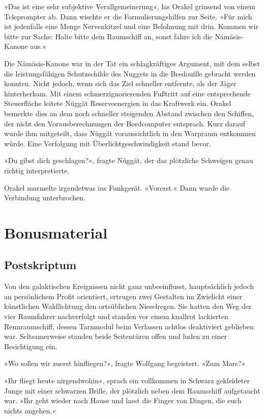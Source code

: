 »Das ist eine sehr subjektive Verallgemeinerung«, las Orakel grinsend von einem Teleprompter ab. Dann wischte er die Formulierungshilfen zur Seite. »Für mich ist jedenfalls eine Menge Nervenkitzel und eine Belohnung mit drin. Kommen wir bitte zur Sache: Halte bitte dein Raumschiff an, sonst fahre ich die Nämäsis-Kanone aus.«

Die Nämäsis-Kanone war in der Tat ein schlagkräftiges Argument, mit dem selbst die leistungsfähigen Schutzschilde des Nuggets in die Bredouille gebracht werden konnten. Nicht jedoch, wenn sich das Ziel schneller entfernte, als der Jäger hinterherkam. Mit einem schmerzignorierenden Fußtritt auf eine entsprechende Steuerfläche leitete Nüggät Reserveenergien in das Kraftwerk ein. Orakel bemerkte dies an dem noch schneller steigenden Abstand zwischen den Schiffen, der nicht den Vorausberechnungen der Bordcomputer entsprach. Kurz darauf wurde ihm mitgeteilt, dass Nüggät voraussichtlich in den Warpraum entkommen würde. Eine Verfolgung mit Überlichtgeschwindigkeit stand bevor.

»Du gibst dich geschlagen?«, fragte Nüggät, der das plötzliche Schweigen genau richtig interpretierte.

Orakel murmelte irgendetwas ins Funkgerät. »Vorerst.« Dann wurde die Verbindung unterbrochen.



\part{Bonusmaterial}

\chapter{Postskriptum}

Von den galaktischen Ereignissen nicht ganz unbeeinflusst, hauptsächlich jedoch an persönlichem Profit orientiert, ertrugen zwei Gestalten im Zwielicht einer künstlichen Waldlichtung den ortsüblichen Nieselregen. Sie hatten den Weg der vier Raumfahrer nachverfolgt und standen vor einem knallrot lackierten Rennraumschiff, dessen Tarnmodul beim Verlassen achtlos deaktiviert geblieben war. Seltsamerweise standen beide Seitentüren offen und luden zu einer Besichtigung ein.

»Wo sollen wir zuerst hinfliegen?«, fragte Wolfgang begeistert. »Zum Mars?«

»Ihr fliegt heute nirgendwohin«, sprach ein vollkommen in Schwarz gekleideter Junge mit einer schwarzen Brille, der plötzlich neben dem Raumschiff aufgetaucht war. »Ihr geht wieder nach Hause und lasst die Finger von Dingen, die euch nichts angehen.«

